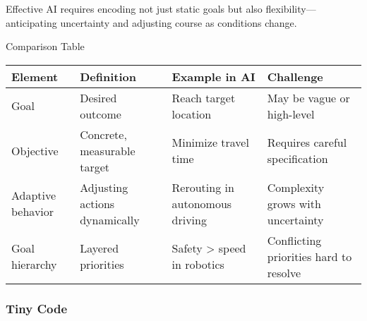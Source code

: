 \documentclass[
  letterpaper,
  DIV=11,
  numbers=noendperiod]{scrreprt}
\begin{document}
Effective AI requires encoding not just static goals but also
flexibility---anticipating uncertainty and adjusting course as
conditions change.

Comparison Table

\begin{longtable}[]{@{}
  >{\raggedright\arraybackslash}p{}
  >{\raggedright\arraybackslash}p{}
  >{\raggedright\arraybackslash}p{}
  >{\raggedright\arraybackslash}p{}@{}}
\toprule\noalign{}
\begin{minipage}[b]{\linewidth}\raggedright
Element
\end{minipage} & \begin{minipage}[b]{\linewidth}\raggedright
Definition
\end{minipage} & \begin{minipage}[b]{\linewidth}\raggedright
Example in AI
\end{minipage} & \begin{minipage}[b]{\linewidth}\raggedright
Challenge
\end{minipage} \\
\midrule\noalign{}
\endhead
\bottomrule\noalign{}
\endlastfoot
Goal & Desired outcome & Reach target location & May be vague or
high-level \\
Objective & Concrete, measurable target & Minimize travel time &
Requires careful specification \\
Adaptive behavior & Adjusting actions dynamically & Rerouting in
autonomous driving & Complexity grows with uncertainty \\
Goal hierarchy & Layered priorities & Safety \textgreater{} speed in
robotics & Conflicting priorities hard to resolve \\
\end{longtable}

\subsubsection{Tiny Code}\label{tiny-code-5}
\end{document}
